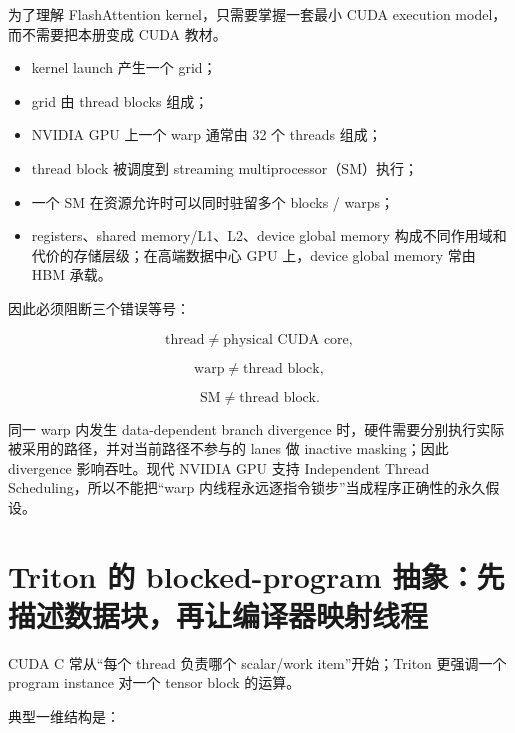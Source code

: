 \documentclass[profile=standard,twoside=false]{ipara-handbook}
\begin{document}
为了理解 FlashAttention kernel，只需要掌握一套最小 CUDA execution model，而不需要把本册变成 CUDA 教材。

\begin{itemize}
  \item kernel launch 产生一个 grid；
  \item grid 由 thread blocks 组成；
  \item NVIDIA GPU 上一个 warp 通常由 32 个 threads 组成；
  \item thread block 被调度到 streaming multiprocessor（SM）执行；
  \item 一个 SM 在资源允许时可以同时驻留多个 blocks / warps；
  \item registers、shared memory/L1、L2、device global memory 构成不同作用域和代价的存储层级；在高端数据中心 GPU 上，device global memory 常由 HBM 承载。
\end{itemize}

因此必须阻断三个错误等号：

$$
\text{thread}\neq\text{physical CUDA core},
$$

$$
\text{warp}\neq\text{thread block},
$$

$$
\text{SM}\neq\text{thread block}.
$$

\begin{handbookdiagram}
\centering

\end{handbookdiagram}

同一 warp 内发生 data-dependent branch divergence 时，硬件需要分别执行实际被采用的路径，并对当前路径不参与的 lanes 做 inactive masking；因此 divergence 影响吞吐。现代 NVIDIA GPU 支持 Independent Thread Scheduling，所以不能把“warp 内线程永远逐指令锁步”当成程序正确性的永久假设。

\section{Triton 的 blocked-program 抽象：先描述数据块，再让编译器映射线程}

CUDA C 常从“每个 thread 负责哪个 scalar/work item”开始；Triton 更强调一个 program instance 对一个 tensor block 的运算。

典型一维结构是：
\end{document}
